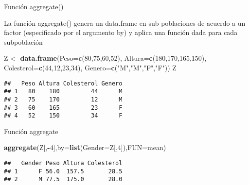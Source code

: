 \documentclass[ignorenonframetext,]{beamer}
\newenvironment{Shaded}{\begin{snugshade}}{\end{snugshade}}
\newcommand{\KeywordTok}[1]{\textcolor[rgb]{0.13,0.29,0.53}{\textbf{#1}}}
\newcommand{\DataTypeTok}[1]{\textcolor[rgb]{0.13,0.29,0.53}{#1}}
\newcommand{\DecValTok}[1]{\textcolor[rgb]{0.00,0.00,0.81}{#1}}
\newcommand{\StringTok}[1]{\textcolor[rgb]{0.31,0.60,0.02}{#1}}
\newcommand{\OperatorTok}[1]{\textcolor[rgb]{0.81,0.36,0.00}{\textbf{#1}}}
\newcommand{\NormalTok}[1]{#1}
\begin{document}
\begin{frame}[fragile]{Función aggregate()}

La función aggregate() genera un data.frame en sub poblaciones de
acuerdo a un factor (especificado por el argumento by) y aplica una
función dada para cada subpoblación

\begin{Shaded}
\begin{Highlighting}[]
\NormalTok{Z <-}\StringTok{ }\KeywordTok{data.frame}\NormalTok{(}\DataTypeTok{Peso=}\KeywordTok{c}\NormalTok{(}\DecValTok{80}\NormalTok{,}\DecValTok{75}\NormalTok{,}\DecValTok{60}\NormalTok{,}\DecValTok{52}\NormalTok{),}
                \DataTypeTok{Altura=}\KeywordTok{c}\NormalTok{(}\DecValTok{180}\NormalTok{,}\DecValTok{170}\NormalTok{,}\DecValTok{165}\NormalTok{,}\DecValTok{150}\NormalTok{),}
                \DataTypeTok{Colesterol=}\KeywordTok{c}\NormalTok{(}\DecValTok{44}\NormalTok{,}\DecValTok{12}\NormalTok{,}\DecValTok{23}\NormalTok{,}\DecValTok{34}\NormalTok{),}
                \DataTypeTok{Genero=}\KeywordTok{c}\NormalTok{(}\StringTok{"M"}\NormalTok{,}\StringTok{"M"}\NormalTok{,}\StringTok{"F"}\NormalTok{,}\StringTok{"F"}\NormalTok{))}
\NormalTok{Z}
\end{Highlighting}
\end{Shaded}

\begin{verbatim}
##   Peso Altura Colesterol Genero
## 1   80    180         44      M
## 2   75    170         12      M
## 3   60    165         23      F
## 4   52    150         34      F
\end{verbatim}

\end{frame}

\begin{frame}[fragile]{Función aggregate}

\begin{Shaded}
\begin{Highlighting}[]
\KeywordTok{aggregate}\NormalTok{(Z[,}\OperatorTok{-}\DecValTok{4}\NormalTok{],}\DataTypeTok{by=}\KeywordTok{list}\NormalTok{(}\DataTypeTok{Gender=}\NormalTok{Z[,}\DecValTok{4}\NormalTok{]),}\DataTypeTok{FUN=}\NormalTok{mean)}
\end{Highlighting}
\end{Shaded}

\begin{verbatim}
##   Gender Peso Altura Colesterol
## 1      F 56.0  157.5       28.5
## 2      M 77.5  175.0       28.0
\end{verbatim}

\end{frame}
\end{document}
